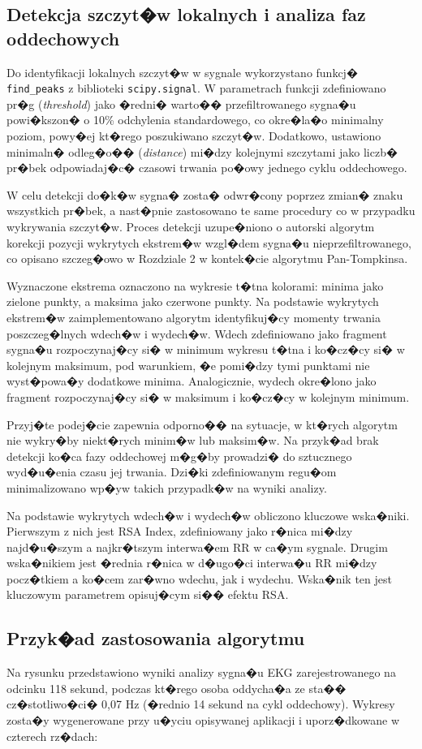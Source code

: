 \subsection{Detekcja szczyt�w lokalnych i analiza faz oddechowych}

Do identyfikacji lokalnych szczyt�w w sygnale wykorzystano funkcj�
\texttt{find\_peaks} z biblioteki \texttt{scipy.signal}. W parametrach funkcji
zdefiniowano pr�g (\textit{threshold}) jako �redni� warto�� przefiltrowanego
sygna�u powi�kszon� o 10\% odchylenia standardowego, co okre�la�o minimalny
poziom, powy�ej kt�rego poszukiwano szczyt�w. Dodatkowo, ustawiono minimaln�
odleg�o�� (\textit{distance}) mi�dzy kolejnymi szczytami jako liczb� pr�bek
odpowiadaj�c� czasowi trwania po�owy jednego cyklu oddechowego.

W celu detekcji do�k�w sygna� zosta� odwr�cony poprzez zmian� znaku wszystkich
pr�bek, a nast�pnie zastosowano te same procedury co w przypadku wykrywania
szczyt�w. Proces detekcji uzupe�niono o autorski algorytm korekcji pozycji
wykrytych ekstrem�w wzgl�dem sygna�u nieprzefiltrowanego, co opisano szczeg�owo
w Rozdziale 2 w kontek�cie algorytmu Pan-Tompkinsa.

Wyznaczone ekstrema oznaczono na wykresie t�tna kolorami: minima jako zielone
punkty, a maksima jako czerwone punkty. Na podstawie wykrytych ekstrem�w
zaimplementowano algorytm identyfikuj�cy momenty trwania poszczeg�lnych wdech�w
i wydech�w. Wdech zdefiniowano jako fragment sygna�u rozpoczynaj�cy si� w
minimum wykresu t�tna i ko�cz�cy si� w kolejnym maksimum, pod warunkiem, �e
pomi�dzy tymi punktami nie wyst�powa�y dodatkowe minima. Analogicznie, wydech
okre�lono jako fragment rozpoczynaj�cy si� w maksimum i ko�cz�cy w kolejnym
minimum.

Przyj�te podej�cie zapewnia odporno�� na sytuacje, w kt�rych algorytm nie
wykry�by niekt�rych minim�w lub maksim�w. Na przyk�ad brak detekcji ko�ca fazy
oddechowej m�g�by prowadzi� do sztucznego wyd�u�enia czasu jej trwania. Dzi�ki
zdefiniowanym regu�om minimalizowano wp�yw takich przypadk�w na wyniki analizy.

Na podstawie wykrytych wdech�w i wydech�w obliczono kluczowe wska�niki.
Pierwszym z nich jest RSA Index, zdefiniowany jako r�nica mi�dzy najd�u�szym a
najkr�tszym interwa�em RR w ca�ym sygnale. Drugim wska�nikiem jest �rednia
r�nica w d�ugo�ci interwa�u RR mi�dzy pocz�tkiem a ko�cem zar�wno wdechu, jak i
wydechu. Wska�nik ten jest kluczowym parametrem opisuj�cym si�� efektu RSA.

\subsection{Przyk�ad zastosowania algorytmu}
Na rysunku przedstawiono wyniki analizy sygna�u EKG zarejestrowanego na odcinku
118 sekund, podczas kt�rego osoba oddycha�a ze sta�� cz�stotliwo�ci� 0,07 Hz
(�rednio 14 sekund na cykl oddechowy). Wykresy zosta�y wygenerowane przy u�yciu
opisywanej aplikacji i uporz�dkowane w czterech rz�dach:

